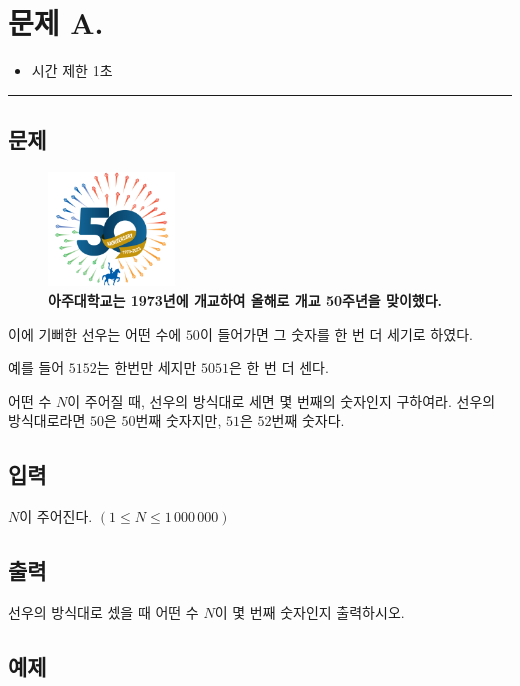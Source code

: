 \newpage
\section*{{\Large 문제 A.} }

\begin{itemize}
    \item 시간 제한 \tabto{2cm} 1초
\end{itemize}

\hrule

\subsection*{문제}

\begin{figure}[h]
    \centering
    \includegraphics[width=0.3\textwidth]{problems/image/50th_emblem_ver02.png}
    \caption{\textbf{아주대학교는 1973년에 개교하여 올해로 개교 50주년을 맞이했다.}}
\end{figure}

이에 기뻐한 선우는 어떤 수에 $50$이 들어가면 그 숫자를 한 번 더 세기로 하였다.

예를 들어 $5152$는 한번만 세지만 $5051$은 한 번 더 센다.

어떤 수 $N$이 주어질 때, 선우의 방식대로 세면 몇 번째의 숫자인지 구하여라. 선우의 방식대로라면 $50$은 $50$번째 숫자지만, $51$은 $52$번째 숫자다.

\subsection*{입력}

$N$이 주어진다. $(1 \leq N\leq 1\, 000\, 000)$

\subsection*{출력}

선우의 방식대로 셌을 때 어떤 수 $N$이 몇 번째 숫자인지 출력하시오.

\subsection*{예제}


